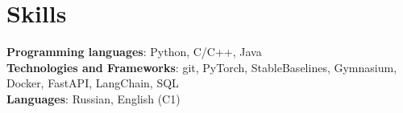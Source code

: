 \documentclass[english,russian,letterpaper,11pt]{article}
\begin{document}
\section{Skills}
 \begin{itemize}[leftmargin=0.15in, label={}]
    \small{\item{
     \textbf{Programming languages}{: Python, C/C++, Java} \\
     \textbf{Technologies and Frameworks}{: git, PyTorch, StableBaselines, Gymnasium, Docker, FastAPI, LangChain, SQL } \\
     \textbf{Languages}{: Russian, English (C1)} \\
    }}
 \end{itemize}

\end{document}
